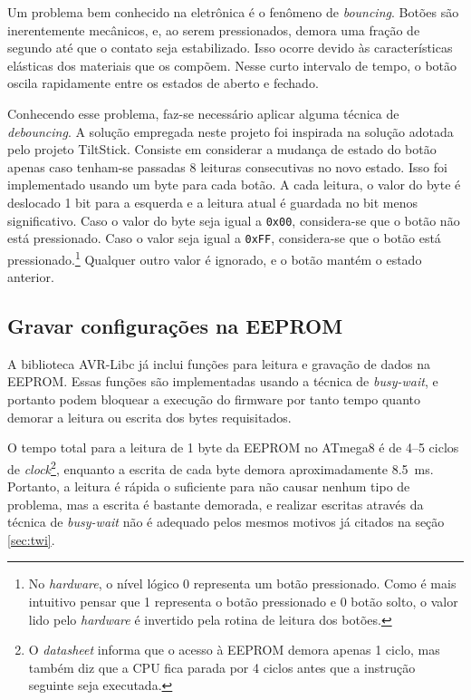 \documentclass[brazil,pagestart=firstchapter]{abnt}
\begin{document}
Um problema bem conhecido na eletrônica é o fenômeno de \textit{bouncing}.
Botões são inerentemente mecânicos, e, ao serem pressionados, demora uma
fração de segundo até que o contato seja estabilizado. Isso ocorre devido às
características elásticas dos materiais que os compõem. Nesse curto
intervalo de tempo, o botão oscila rapidamente entre os estados de aberto e
fechado.

Conhecendo esse problema, faz-se necessário aplicar alguma técnica de
\textit{debouncing}. A solução empregada neste projeto foi inspirada na
solução adotada pelo projeto TiltStick. \cite{TiltStick} Consiste em
considerar a mudança de estado do botão apenas caso tenham-se passadas 8
leituras consecutivas no novo estado. Isso foi implementado usando um byte
para cada botão. A cada leitura, o valor do byte é deslocado 1 bit para a
esquerda e a leitura atual é guardada no bit menos significativo. Caso o
valor do byte seja igual a \texttt{0x00}, considera-se que o botão não está
pressionado. Caso o valor seja igual a \texttt{0xFF}, considera-se que o
botão está pressionado.\footnote{
	No \textit{hardware}, o nível lógico 0 representa um botão pressionado.
	Como é mais intuitivo pensar que 1 representa o botão pressionado e 0
	botão solto, o valor lido pelo \textit{hardware} é invertido pela rotina
	de leitura dos botões.
} Qualquer outro valor é ignorado, e o botão mantém o estado anterior.


\subsection{Gravar configurações na EEPROM}
\label{sub:eeprom}

A biblioteca AVR-Libc já inclui funções para leitura e gravação de dados na
\ac{EEPROM}. Essas funções são implementadas usando a técnica de
\textit{busy-wait}, e portanto podem bloquear a execução do firmware por
tanto tempo quanto demorar a leitura ou escrita dos bytes requisitados.
\cite{avrlibceeprom}

O tempo total para a leitura de 1 byte da \ac{EEPROM} no ATmega8 é de
\numrange[range-phrase={ ou }]{4}{5} ciclos de \textit{clock}\footnote{
	O \textit{datasheet} informa que o acesso à \ac{EEPROM} demora apenas
	1 ciclo, mas também diz que a CPU fica parada por 4 ciclos antes que
	a instrução seguinte seja executada.
}, enquanto a escrita de cada byte demora aproximadamente
\SI{8.5}{\milli\second}. \cite[p.~21]{ATmega8} Portanto, a leitura é rápida
o suficiente para não causar nenhum tipo de problema, mas a escrita
é bastante demorada, e realizar escritas através da técnica de
\textit{busy-wait} não é adequado pelos mesmos motivos já citados na seção
\ref{sec:twi}.
\end{document}
